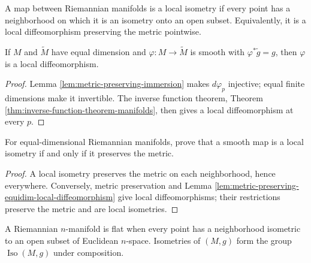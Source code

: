 \begin{definition}
\label{def:local-isometry}
\leanok
{}
A map between Riemannian manifolds is a local isometry if every point has a neighborhood on which it is an isometry onto an open subset. Equivalently, it is a local diffeomorphism preserving the metric pointwise.
\end{definition}

\begin{lemma}
\label{lem:metric-preserving-equidim-local-diffeomorphism}
\leanok
{}
If $M$ and $\widetilde M$ have equal dimension and $\varphi:M\to\widetilde M$ is smooth with $\varphi^*\widetilde g=g$, then $\varphi$ is a local diffeomorphism.
\end{lemma}
\begin{proof}
\leanok
{}
\sketch Lemma \ref{lem:metric-preserving-immersion} makes $d\varphi_p$ injective; equal finite dimensions make it invertible. The inverse function theorem, Theorem \ref{thm:inverse-function-theorem-manifolds}, then gives a local diffeomorphism at every $p$.
\end{proof}

\begin{exercise}
\label{exer:characterize-local-isometry}
\leanok
{}
For equal-dimensional Riemannian manifolds, prove that a smooth map is a local isometry if and only if it preserves the metric.
\end{exercise}
\begin{proof}
\leanok
{}
\sketch A local isometry preserves the metric on each neighborhood, hence everywhere. Conversely, metric preservation and Lemma \ref{lem:metric-preserving-equidim-local-diffeomorphism} give local diffeomorphisms; their restrictions preserve the metric and are local isometries.
\end{proof}

A Riemannian $n$-manifold is flat when every point has a neighborhood isometric to an open subset of Euclidean $n$-space. Isometries of $(M,g)$ form the group $\operatorname{Iso}(M,g)$ under composition.

